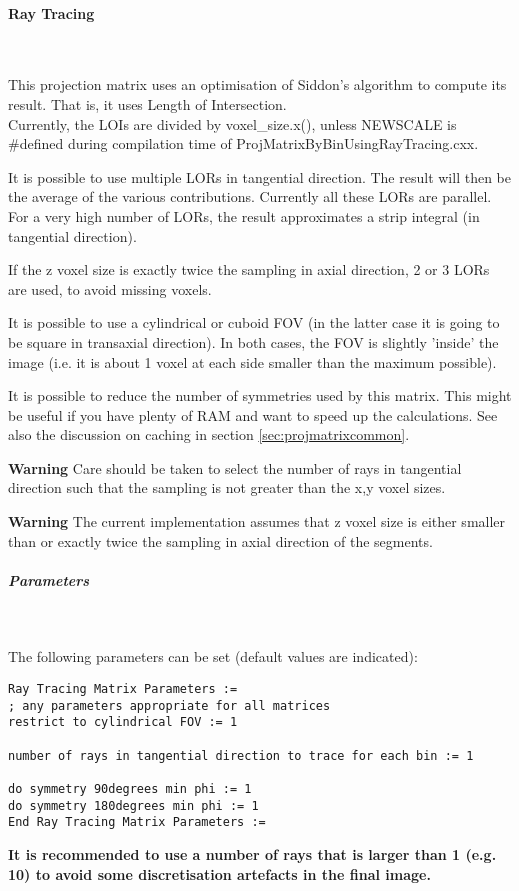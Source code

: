 \documentclass{article}
\newcommand{\subsubsubsection}[1]{\paragraph{#1}\mbox{} \\}
\newcommand{\subsubsubsubsection}[1]{\subparagraph{#1} \mbox{} \\}
\begin{document}
{{ \subsubsubsection{Ray Tracing}
}
\label{sec:projmatrixusingraytracing}
This projection matrix uses an optimisation of Siddon's algorithm 
to compute its result. That is, it uses Length of Intersection.\\
Currently, the LOIs are divided by voxel\_size.x(), unless NEWSCALE 
is \#defined during compilation time of ProjMatrixByBinUsingRayTracing.cxx. 

It is possible to use multiple LORs in tangential direction. 
The result will then be the average of the various contributions. 
Currently all these LORs are parallel. For a very high number 
of LORs, the result approximates a strip integral (in tangential 
direction).

If the z voxel size is exactly twice the sampling in axial direction, 
2 or 3 LORs are used, to avoid missing voxels. 

It is possible to use a cylindrical or cuboid FOV (in the latter 
case it is going to be square in transaxial direction). In both 
cases, the FOV is slightly 'inside' the image (i.e. it is about 
1 voxel at each side smaller than the maximum possible).

It is possible to reduce the number of symmetries used by this 
matrix. This might be useful if you have plenty of RAM and want 
to speed up the calculations. See also the discussion on caching 
in section \ref{sec:projmatrixcommon}.

\textbf{Warning} Care should be taken to select the number of rays 
in tangential direction such that the sampling is not greater 
than the x,y voxel sizes.

\textbf{Warning} The current implementation assumes that z voxel size 
is either smaller than or exactly twice the sampling in axial 
direction of the segments.

{ \subsubsubsubsection{Parameters}
}
The following parameters can be set (default values are indicated):
\begin{verbatim}
Ray Tracing Matrix Parameters := 
; any parameters appropriate for all matrices
restrict to cylindrical FOV := 1

number of rays in tangential direction to trace for each bin := 1

do symmetry 90degrees min phi := 1 
do symmetry 180degrees min phi := 1
End Ray Tracing Matrix Parameters :=
\end{verbatim}

\textbf{It is recommended to use a number of rays that is larger than 1 (e.g. 10) to
avoid some discretisation artefacts in the final image.}

}
\end{document}
